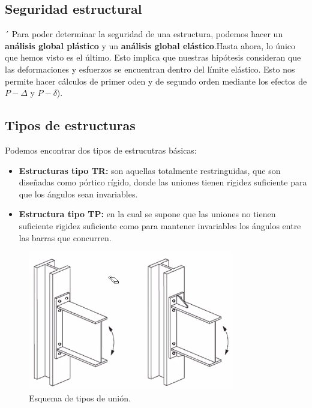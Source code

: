 \documentclass[../main.tex]{subfiles}
\begin{document}
\subsection{Seguridad estructural}
´
Para poder determinar la seguridad de una estructura, podemos hacer un
\textbf{análisis global plástico} y un \textbf{análisis global elástico}.Hasta ahora, 
lo único que hemos visto es el último. Esto implica que nuestras hipótesis 
consideran que las deformaciones y esfuerzos se encuentran dentro del límite elástico.
Esto nos permite hacer cálculos de primer oden y de segundo orden mediante los
efectos de $P-\Delta$ y $P-\delta$).

\subsection{Tipos de estructuras}

Podemos encontrar dos tipos de estrucutras básicas:

\begin{itemize}
  \item \textbf{Estructuras tipo TR:} son aquellas totalmente restringuidas, que
    son diseñadas como pórtico rígido, donde las uniones tienen rigidez 
    suficiente para que los ángulos sean invariables.
  \item \textbf{Estructura tipo TP:} en la cual se supone que las uniones no 
    tienen suficiente rigidez suficiente como para mantener invariables los 
    ángulos entre las barras que concurren.
\end{itemize}

\begin{figure}[ht]
  \centering
  \includegraphics[width=0.8\textwidth]{../images/20210315/esq.png}
  \caption{Esquema de tipos de unión.}
  \label{fig:esq-png}
\end{figure}
\end{document}
